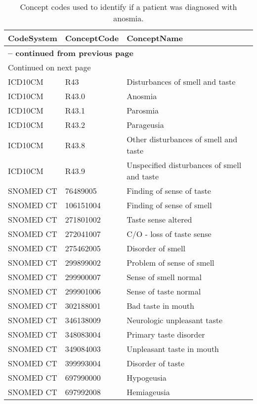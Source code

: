 \begin{longtable}{p{}p{}p{}}
\caption{Concept codes used to identify if a patient was diagnosed with anosmia.} \\ 
 CodeSystem & ConceptCode & ConceptName \\ 
  \hline 
\endfirsthead 
\multicolumn{3}{p{\textwidth}}{{ \bfseries \tablename \thetable{} -- continued from previous page}} \ 
\hline CodeSystem & ConceptCode & ConceptName \\ \hline 
\endhead 
\hline \multicolumn{3}{p{\textwidth}}{{Continued on next page}} \\ \hline 
\endfoot 
\hline 
\endlastfoot 
 \hline
ICD10CM & R43 & Disturbances of smell and taste \\ 
  ICD10CM & R43.0 & Anosmia \\ 
  ICD10CM & R43.1 & Parosmia \\ 
  ICD10CM & R43.2 & Parageusia \\ 
  ICD10CM & R43.8 & Other disturbances of smell and taste \\ 
  ICD10CM & R43.9 & Unspecified disturbances of smell and taste \\ 
  SNOMED CT & 76489005 & Finding of sense of taste \\ 
  SNOMED CT & 106151004 & Finding of sense of smell \\ 
  SNOMED CT & 271801002 & Taste sense altered \\ 
  SNOMED CT & 272041007 & C/O - loss of taste sense \\ 
  SNOMED CT & 275462005 & Disorder of smell \\ 
  SNOMED CT & 299899002 & Problem of sense of smell \\ 
  SNOMED CT & 299900007 & Sense of smell normal \\ 
  SNOMED CT & 299901006 & Sense of taste normal \\ 
  SNOMED CT & 302188001 & Bad taste in mouth \\ 
  SNOMED CT & 346138009 & Neurologic unpleasant taste \\ 
  SNOMED CT & 348083004 & Primary taste disorder \\ 
  SNOMED CT & 349084003 & Unpleasant taste in mouth \\ 
  SNOMED CT & 399993004 & Disorder of taste \\ 
  SNOMED CT & 697990000 & Hypogeusia \\ 
  SNOMED CT & 697992008 & Hemiageusia \\ 

\end{longtable}
